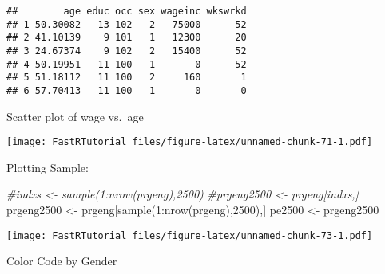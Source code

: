 \documentclass[
]{article}
\newenvironment{Shaded}{\begin{snugshade}}{\end{snugshade}}
\newcommand{\AttributeTok}[1]{\textcolor[rgb]{0.77,0.63,0.00}{#1}}
\newcommand{\CommentTok}[1]{\textcolor[rgb]{0.56,0.35,0.01}{\textit{#1}}}
\newcommand{\DecValTok}[1]{\textcolor[rgb]{0.00,0.00,0.81}{#1}}
\newcommand{\FunctionTok}[1]{\textcolor[rgb]{0.00,0.00,0.00}{#1}}
\newcommand{\NormalTok}[1]{#1}
\newcommand{\OtherTok}[1]{\textcolor[rgb]{0.56,0.35,0.01}{#1}}
\newcommand{\SpecialCharTok}[1]{\textcolor[rgb]{0.00,0.00,0.00}{#1}}
\begin{document}
\begin{verbatim}
##        age educ occ sex wageinc wkswrkd
## 1 50.30082   13 102   2   75000      52
## 2 41.10139    9 101   1   12300      20
## 3 24.67374    9 102   2   15400      52
## 4 50.19951   11 100   1       0      52
## 5 51.18112   11 100   2     160       1
## 6 57.70413   11 100   1       0       0
\end{verbatim}

Scatter plot of wage vs.~age

\begin{Shaded}
\end{Shaded}

\texttt{[image: FastRTutorial\_files/figure-latex/unnamed-chunk-71-1.pdf]}

Plotting Sample:

\begin{Shaded}
\begin{Highlighting}[]
\CommentTok{\#indxs \textless{}{-} sample(1:nrow(prgeng),2500)}
\CommentTok{\#prgeng2500 \textless{}{-} prgeng[indxs,]}
\NormalTok{prgeng2500 }\OtherTok{\textless{}{-}}\NormalTok{ prgeng[}\FunctionTok{sample}\NormalTok{(}\DecValTok{1}\SpecialCharTok{:}\FunctionTok{nrow}\NormalTok{(prgeng),}\DecValTok{2500}\NormalTok{),]}
\NormalTok{pe2500 }\OtherTok{\textless{}{-}}\NormalTok{ prgeng2500}
\end{Highlighting}
\end{Shaded}

\begin{Shaded}
\end{Shaded}

\texttt{[image: FastRTutorial\_files/figure-latex/unnamed-chunk-73-1.pdf]}

Color Code by Gender

\begin{Shaded}
\end{Shaded}
\end{document}
